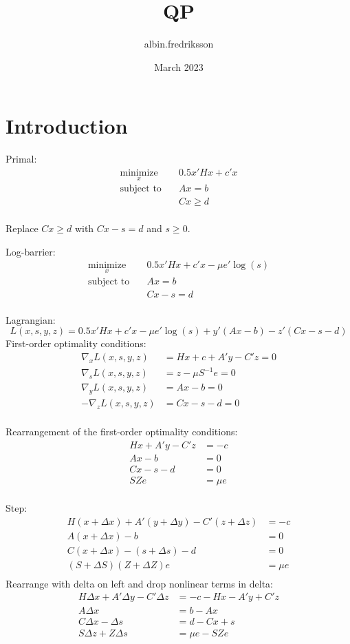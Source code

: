 \documentclass{article}
\title{QP}
\author{albin.fredriksson }
\date{March 2023}
\begin{document}
\maketitle

\section{Introduction}
Primal:
\begin{align*}
\underset{x}{\text{minimize}} \quad & 0.5 x' H x + c' x\\
\text{subject to} \quad
& A x = b\\
& C x \geq d\\
\end{align*}

Replace $C x \geq d$ with $C x - s = d$ and $s \geq 0$.

Log-barrier:
\begin{align*}
\underset{x}{\text{minimize}} \quad & 0.5 x' H x + c' x - \mu e' \log(s) \\
\text{subject to} \quad
& A x = b\\
& C x - s = d\\
\end{align*}


Lagrangian:
\[
L(x, s, y, z) = 0.5 x' H x + c' x - \mu e' \log(s) + y' (Ax - b) - z' (C x - s - d )
\]
First-order optimality conditions:
\begin{align*}
\nabla_x L(x,s,y,z) &= H x + c + A' y - C' z = 0\\
\nabla_s L(x,s,y,z) &= z - \mu S^{-1}e = 0\\
\nabla_y L(x,s,y,z) &= A x - b = 0\\
-\nabla_z L(x,s,y,z) &= C x - s - d = 0\\
\end{align*}

Rearrangement of the first-order optimality conditions:
\begin{align*}
Hx + A' y - C' z &= -c\\
A x - b &= 0\\
C x - s - d &= 0\\
SZe  &=  \mu e\\
\end{align*}

Step:
\begin{align*}
H(x + \Delta x) + A' (y + \Delta y) - C' (z + \Delta z) &= -c\\
A (x + \Delta x) - b &= 0\\
C (x + \Delta x) - (s + \Delta s) - d &= 0\\
(S + \Delta S) (Z + \Delta Z)e  &=  \mu e\\
\end{align*}
Rearrange with delta on left and drop nonlinear terms in delta:
\begin{align*}
H \Delta x + A' \Delta y - C' \Delta z &= -c - Hx - A' y + C' z \\
A \Delta x &= b - A x\\
C \Delta x - \Delta s &= d - C x + s\\
S \Delta z + Z \Delta s &= \mu e - SZe\\
\end{align*}
\end{document}
